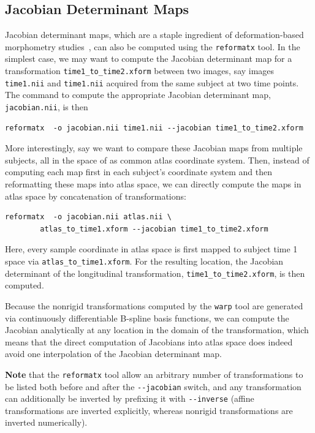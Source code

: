 \documentclass{InsightArticle}
\begin{document}
\subsection{Jacobian Determinant Maps}

Jacobian determinant maps, which are a staple ingredient of deformation-based
morphometry studies~\cite{AshbHuttFrac:1998}, can also be computed using the
\verb|reformatx| tool. In the simplest case, we may want to compute the
Jacobian determinant map for a transformation \verb|time1_to_time2.xform|
between two images, say images \verb|time1.nii| and \verb|time1.nii| acquired
from the same subject at two time points. The command to compute the
appropriate Jacobian determinant map, \verb|jacobian.nii|, is then
\begin{verbatim}
reformatx  -o jacobian.nii time1.nii --jacobian time1_to_time2.xform
\end{verbatim}
More interestingly, say we want to compare these Jacobian maps from multiple
subjects, all in the space of as common atlas coordinate system. Then, instead
of computing each map first in each subject's coordinate system and then
reformatting these maps into atlas space, we can directly compute the maps in
atlas space by concatenation of transformations:
\begin{verbatim}
reformatx  -o jacobian.nii atlas.nii \
        atlas_to_time1.xform --jacobian time1_to_time2.xform
\end{verbatim}
Here, every sample coordinate in atlas space is first mapped to subject time 1
space via \verb|atlas_to_time1.xform|. For the resulting location, the
Jacobian determinant of the longitudinal transformation,
\verb|time1_to_time2.xform|, is then computed.

Because the nonrigid transformations computed by the \verb|warp| tool are
generated via continuously differentiable B-spline basis functions, we can
compute the Jacobian analytically at any location in the domain of the
transformation, which means that the direct computation of Jacobians into
atlas space does indeed avoid one interpolation of the Jacobian determinant
map.

{\bf Note} that the \verb|reformatx| tool allow an arbitrary number of
transformations to be listed both before and after the \verb|--jacobian|
switch, and any transformation can additionally be inverted by prefixing it
with \verb|--inverse| (affine transformations are inverted explicitly, whereas
nonrigid transformations are inverted numerically). 
\end{document}

